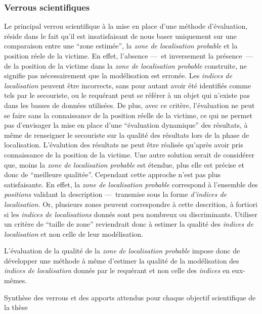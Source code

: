 \subsubsection{Verrous scientifiques}

Le principal verrou scientifique à la mise en place d'une méthode
d'évaluation, réside dans le fait qu'il est insatisfaisant de nous
baser uniquement sur une comparaison entre une \enquote{zone estimée},
\ie la \emph{zone de localisation probable} et la position réele de la
victime. En effet, l'absence ---~et inversement la présence~--- de la
position de la victime dans la \emph{zone de localisation probable}
construite, ne signifie pas nécessairement que la modélisation est
erronée. Les \emph{indices de localisation} peuvent être incorrects,
sans pour autant avoir été identifiés comme tels par le secouriste, ou
le requérant peut se référer à un objet qui n'existe pas dans les
basses de données utilisées. De plus, avec ce critère, l'évaluation ne
peut se faire sans la connaissance de la position réelle de la
victime, ce qui ne permet pas d'envisager la mise en place d'une
\enquote{évaluation dynamique} des résultats, à même de renseigner le
secouriste sur la qualité des résultats lors de la phase de
localisation. L'évalution des résultats ne peut être réalisée qu'après
avoir pris connaissance de la position de la victime. Une autre
solution serait de considérer que, moins la \emph{zone de localisation
  probable} est étendue, plus elle est précise et donc de
\enquote{meilleure qualitée}. Cependant cette approche n'est pas plus
satisfaisante.  En effet, la \emph{zone de localisation probable}
correspond à l'ensemble des \emph{positions} validant la description
---~transmise sous la forme \emph{d'indices de localisation}. Or,
plusieurs zones peuvent correspondre à cette descrition, à fortiori si
les \emph{indices de localisations} donnés sont peu nombreux ou
discriminants. Utiliser un critère de \enquote{taille de zone}
reviendrait donc à estimer la qualité des \emph{indices de
  localisation} et non celle de leur modélisation.

L’évaluation de la qualité de la \emph{zone de localisation probable}
impose donc de développer une méthode à même d'estimer la qualité de
la modélisation des \emph{indices de localisation} donnés par le
requérant et non celle des \emph{indices} en eux-mêmes. 

\begin{landscape}
\begin{table}[H]
  \centering
  
  \caption{Synthèse des verrous et des apports attendus pour chaque
    objectif scientifique de la thèse}
  \label{tab:synthese_objectifs}
\end{table}
\end{landscape}



